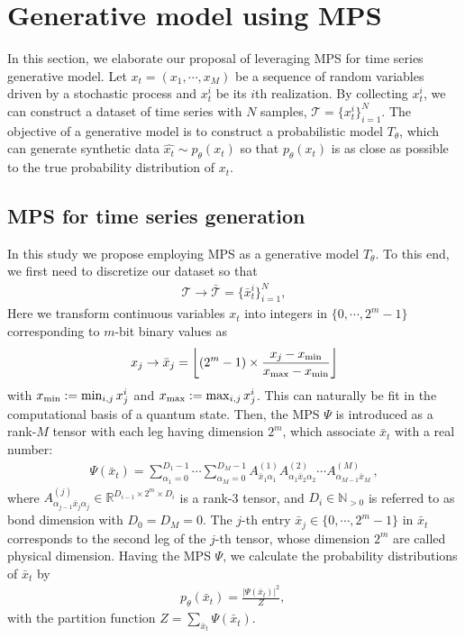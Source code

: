 {\section{Generative model using MPS}\label{sec:MPS}
In this section, we elaborate our proposal of leveraging MPS for time series generative model.
Let $x_t=(x_1,\cdots,x_M)$ be a sequence of random variables driven by a stochastic process and $x_t^i$ be its $i$th realization.
By collecting $x_t^i$, we can construct a dataset of time series with $N$ samples, $\mathcal{T} = \{x_t^i\}_{i=1}^N$.
The objective of a generative model is to construct a probabilistic model $T_\theta$, which can generate synthetic data $\hat{x_t}  \sim p_\theta (x_t)$ so that $p_\theta (x_t)$ is as close as possible to the true probability distribution of $x_t$.

\subsection{MPS for time series generation}
In this study we propose employing MPS as a generative model $T_\theta$. 
To this end, we first need to discretize our dataset so that
\begin{align}
    \mathcal{T} \rightarrow \bar{\mathcal{T}} = \{ \bar{x}_t^i \}_{i=1}^N, 
\end{align}
Here we transform continuous variables $x_t$ into integers in $\{0,\cdots,2^m-1\}$ corresponding to $m$-bit binary values as
\begin{align} \label{eq:discretize_price}
    x_j \rightarrow  \bar{x}_j = \left\lfloor ( 2^m - 1) \times \frac{x_j - x_{\rm min}}{x_{\rm max} - x_{\rm min}} \right\rfloor
\end{align}
with $x_{\rm min}:=\min_{i,j} x_j^i$ and $x_{\rm max}:=\max_{i,j} x_j^i$.
This can naturally be fit in the computational basis of a quantum state.
Then, the MPS $\Psi$ is introduced as a rank-$M$ tensor with each leg having dimension $2^m$, which associate $\bar x_t$ with a real number:
\begin{align}
    \Psi(\bar x_t) = \sum_{\alpha_1=0}^{D_1-1}\cdots\sum_{\alpha_M=0}^{D_M-1} A^{(1)}_{\bar x_1 \alpha_1} A^{(2)}_{\alpha_1 \bar x_2 \alpha_2} \cdots A^{(M)}_{\alpha_{M-1} \bar x_M} \, ,  \label{eq:our_MPS}
\end{align}
where $A^{(j)}_{\alpha_{j-1} \bar x_j \alpha_j} \in \mathbb{R}^{D_{i-1} \times 2^m \times D_i}$ is a rank-3 tensor, and $D_i \in \mathbb{N}_{> 0}$ is referred to as bond dimension with $D_0 = D_M = 0$.
The $j$-th entry $\bar x_j\in\{0,\cdots,2^m-1\}$ in $\bar{x}_t$ corresponds to the second leg of the $j$-th tensor, whose dimension $2^m$ are called physical dimension.
Having the MPS $\Psi$, we calculate the probability distributions of $\bar x_t$ by 
\begin{align}
    p_\theta (\bar x_t) = \frac{ |\Psi (\bar x_t)|^2}{Z} , \, 
\end{align}
with the partition function $Z = \sum_{\bar x_t} \Psi (\bar x_t)$.

}
